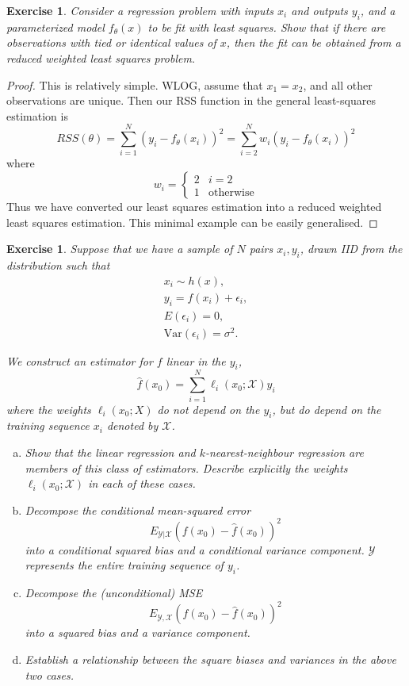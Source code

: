 \documentclass[12pt]{amsart}
\theoremstyle{plain}%
\newtheorem{exer}[thm]{Exercise}
\theoremstyle{definition}
\theoremstyle{remark}
\begin{document}
\begin{exer}
    Consider a regression problem with inputs $x_i$ and outputs $y_i$, and a parameterized model $f_\theta(x)$ to be fit with least squares.  Show that if there are observations with \emph{tied} or \emph{identical} values of $x$, then the fit can be obtained from a reduced weighted least squares problem.
\end{exer}

\begin{proof}
    This is relatively simple.  WLOG, assume that $x_1 = x_2$, and all other observations are unique.  Then our RSS function in the general least-squares estimation is \[
        RSS(\theta) = \sum_{i=1}^N \left(y_i - f_\theta(x_i) \right)^2 = \sum_{i=2}^N w_i \left(y_i - f_\theta(x_i) \right)^2 
    \] where \[
        w_i = \begin{cases}
            2 & i = 2 \\
            1 & \text{otherwise}
        \end{cases}
    \]
    Thus we have converted our least squares estimation into a reduced weighted least squares estimation.  This minimal example can be easily generalised.
\end{proof}

\begin{exer}
    Suppose that we have a sample of $N$ pairs $x_i, y_i$, drawn IID from the distribution such that \begin{align*}
        x_i \sim h(x), \\
        y_i = f(x_i) + \epsilon_i, \\
        E(\epsilon_i) = 0, \\
        \text{Var}(\epsilon_i) = \sigma^2.
    \end{align*}
    
    We construct an estimator for $f$ linear in the $y_i$, \[
        \hat f(x_0) = \sum_{i=1}^N \ell_i(x_0; \mathcal X) y_i
    \] where the weights $\ell_i(x_0; X)$ do not depend on the $y_i$, but do depend on the training sequence $x_i$ denoted by $\mathcal X$.  
    \begin{enumerate}[(a)]
        \item Show that the linear regression and $k$-nearest-neighbour regression are members of this class of estimators.  Describe explicitly the weights $\ell_i(x_0; \mathcal X)$ in each of these cases.
        \item Decompose the conditional mean-squared error \[
            E_{\mathcal Y | \mathcal X} \left( f(x_0) - \hat f(x_0) \right)^2
        \] into a conditional squared bias and a conditional variance component.  $\mathcal Y$ represents the entire training sequence of $y_i$.
        \item Decompose the (unconditional) MSE \[
            E_{\mathcal Y, \mathcal X}\left(f(x_0) - \hat f(x_0) \right)^2
        \] into a squared bias and a variance component.
        \item Establish a relationship between the square biases and variances in the above two cases.
    \end{enumerate}
\end{exer}
\end{document}
